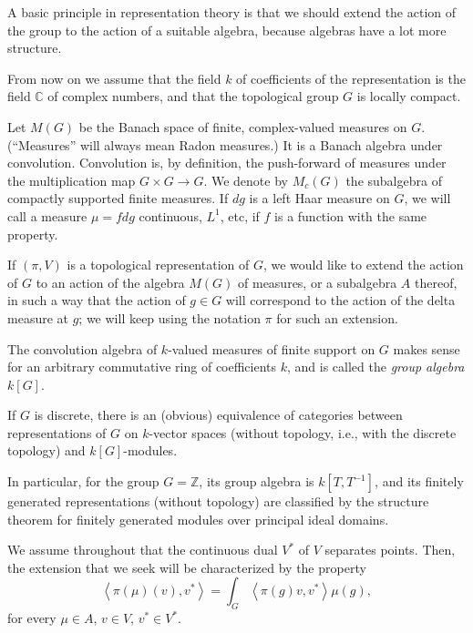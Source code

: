 A basic principle in representation theory is that we should extend the action of the group to the action of a suitable algebra, because algebras have a lot more structure.


From now on we assume that the field $k$ of coefficients of the representation is the field $\mathbb C$ of complex numbers, and that the topological group $G$ is locally compact. 

Let $M(G)$ be the Banach space of finite, complex-valued measures on $G$. (``Measures'' will always mean Radon measures.) It is a Banach algebra under convolution. Convolution is, by definition, the push-forward of measures under the multiplication map $G\times G \to G$. We denote by $M_c(G)$ the subalgebra of compactly supported finite measures. If $dg$ is a left Haar measure on $G$, we will call a measure $\mu= f dg$ continuous, $L^1$, etc, if $f$ is a function with the same property.



If $(\pi, V)$ is a topological representation of $G$, we would like to extend the action of $G$ to an action of the algebra $M(G)$ of measures, or a subalgebra $A$ thereof, in such a way that the action of $g\in G$ will correspond to the action of the delta measure at $g$; we will keep using the notation $\pi$ for such an extension. 

\begin{example}
\label{example-groupalgebra}
The convolution algebra of $k$-valued measures of finite support on $G$ makes sense for an arbitrary commutative ring of coefficients $k$, and is called the {\it group algebra} $k[G]$. 

If $G$ is discrete, there is an (obvious) equivalence of categories between representations of $G$ on $k$-vector spaces (without topology, i.e., with the discrete topology) and $k[G]$-modules.
\end{example}



\begin{example}
\label{example-groupalgebra-Z}
In particular, for the group $G=\mathbb Z$, its group algebra is $k[T,T^{-1}]$, and its finitely generated representations (without topology) are classified by the structure theorem for finitely generated modules over principal ideal domains.
\end{example}



We assume throughout that the continuous dual $V^*$ of $V$ separates points. Then, the extension that we seek will be characterized by the property
\begin{equation}
\label{equation-action-measures}
\left <\pi(\mu)(v), v^*\right> = \int_G \left <\pi(g)v, v^*\right> \mu(g),
\end{equation}
for every $\mu\in A$, $v\in V$, $v^*\in V^*$. 


